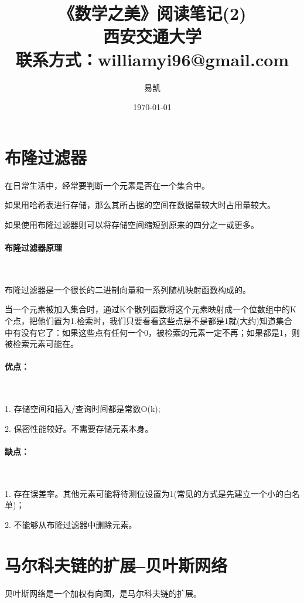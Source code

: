 \documentclass[UTF8]{ctexart}
\title{\Huge{《数学之美》阅读笔记(2)\\} \huge{西安交通大学 \\ 联系方式：williamyi96@gmail.com\\ }}
\author{\huge{易凯}}
\date{\Huge\today}
\begin{document}
	\maketitle
	\vspace{100mm}
	\newpage
	\tableofcontents
	\newpage

	\section{布隆过滤器}
	在日常生活中，经常要判断一个元素是否在一个集合中。

	如果用哈希表进行存储，那么其所占据的空间在数据量较大时占用量较大。

	如果使用布隆过滤器则可以将存储空间缩短到原来的四分之一或更多。

	\paragraph{布隆过滤器原理}

	~

	布隆过滤器是一个很长的二进制向量和一系列随机映射函数构成的。

	当一个元素被加入集合时，通过K个散列函数将这个元素映射成一个位数组中的K个点，把他们置为1.检索时，我们只要看看这些点是不是都是1就(大约)知道集合中有没有它了：如果这些点有任何一个0，被检索的元素一定不再；如果都是1，则被检索元素可能在。

	\paragraph{优点：}

	~

	1. 存储空间和插入/查询时间都是常数O(k);

	2. 保密性能较好。不需要存储元素本身。

	\paragraph{缺点：}

	~

	1. 存在误差率。其他元素可能将待测位设置为1(常见的方式是先建立一个小的白名单)；

	2. 不能够从布隆过滤器中删除元素。

	\section{马尔科夫链的扩展--贝叶斯网络}
	贝叶斯网络是一个加权有向图，是马尔科夫链的扩展。
\end{document}
